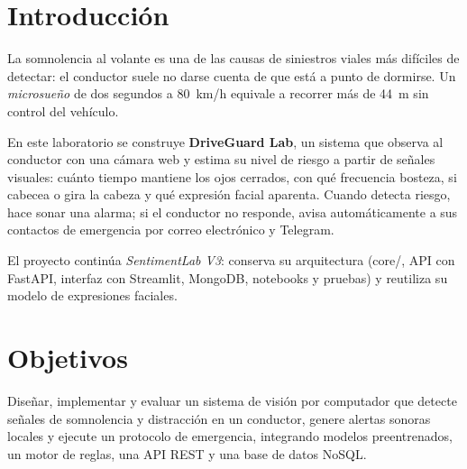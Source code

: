 \documentclass[11pt,a4paper]{article}
\newcommand{\codigoguion}{\textunderscore\allowbreak}
\newcommand{\codigo}[1]{{\small\ttfamily\let\_\codigoguion #1}}
\begin{document}
\tableofcontents
\newpage

\section{Introducción}
La somnolencia al volante es una de las causas de siniestros viales más difíciles de detectar: el conductor
suele no darse cuenta de que está a punto de dormirse. Un \emph{microsueño} de dos segundos a
\SI{80}{km/h} equivale a recorrer más de \SI{44}{m} sin control del vehículo.

En este laboratorio se construye \textbf{DriveGuard Lab}, un sistema que observa al conductor con una
cámara web y estima su nivel de riesgo a partir de señales visuales: cuánto tiempo mantiene los ojos
cerrados, con qué frecuencia bosteza, si cabecea o gira la cabeza y qué expresión facial aparenta. Cuando
detecta riesgo, hace sonar una alarma; si el conductor no responde, avisa automáticamente a sus contactos
de emergencia por correo electrónico y Telegram.

El proyecto continúa \emph{SentimentLab V3}: conserva su arquitectura (\codigo{core/}, API con FastAPI,
interfaz con Streamlit, MongoDB, notebooks y pruebas) y reutiliza su modelo de expresiones faciales.

\section{Objetivos}
\begin{objetivo}
Diseñar, implementar y evaluar un sistema de visión por computador que detecte señales de somnolencia y
distracción en un conductor, genere alertas sonoras locales y ejecute un protocolo de emergencia,
integrando modelos preentrenados, un motor de reglas, una API REST y una base de datos NoSQL.
\end{objetivo}
\end{document}
